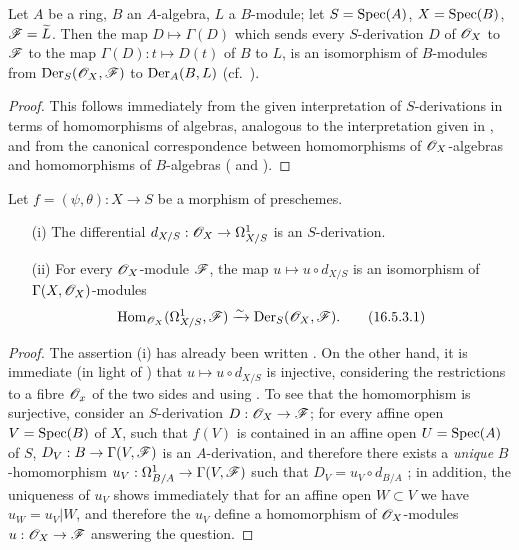 \begin{proposition}[16.5.2]
\label{IV.16.5.2}
Let $A$ be a ring, $B$ an $A$-algebra, $L$ a $B$-module;
let $S = \operatorname{Spec}(A)$, $X=\operatorname{Spec}(B)$, $\mathscr{F} = \widetilde{L}$.
Then the map $D \mapsto \Gamma(D)$ which sends every $S$-derivation $D$ of $\mathscr{O}_X$ to $\mathscr{F}$ to the map $\Gamma(D) : t \mapsto D(t)$ of $B$ to $L$, is an isomorphism of $B$-modules from $\operatorname{Der}_S(\mathscr{O}_X, \mathscr{F})$ to $\operatorname{Der}_A(B, L)$ (cf.~).
\end{proposition}

\begin{proof}
This follows immediately from the given interpretation of $S$-derivations in terms
of homomorphisms of algebras, analogous to the interpretation given in , and from the canonical correspondence between homomorphisms of $\mathscr{O}_X$-algebras and homomorphisms of $B$-algebras ( and ).
\end{proof}

\begin{proposition}[16.5.3]
\label{IV.16.5.3}
Let $f = (\psi, \theta) : X \to S$ be a morphism of preschemes.
\begin{enumerate}
  \item[{\rm(i)}] The differential $d_{X/S} : \sh{O}_X \to \Omega_{X/S}^1$  is an $S$-derivation.
  \item[{\rm(ii)}] For every $\mathscr{O}_X$-module $\mathscr{F}$, the map $u \mapsto u \circ d_{X/S}$ is an isomorphism of $\Gamma(X, \mathscr{O}_X)$-modules
  \[
  \label{IV.16.5.3.1}
    \operatorname{Hom}_{\mathscr{O}_X}(\Omega_{X/S}^1, \mathscr{F}) \xrightarrow{\sim} \operatorname{Der}_S(\mathscr{O}_X, \mathscr{F}).
    \tag{16.5.3.1}
  \]
\end{enumerate}
\end{proposition}

\begin{proof}
The assertion (i) has already been written .
On the other hand, it is immediate (in light of ) that $u \mapsto u\circ d_{X/S}$ is injective, considering the restrictions to a fibre $\mathscr{O}_x$ of the two sides and using .
To see that the homomorphism  is surjective, consider an $S$-derivation $D : \sh{O}_X \to \sh{F}$;
for every affine open $V = \operatorname{Spec}(B)$ of $X$, such that $f(V)$ is contained in an affine open $U = \operatorname{Spec}(A)$ of $S$, $D_V : B \to \Gamma(V, \sh{F}) $ is an $A$-derivation, and therefore there exists a \emph{unique} $B$-homomorphism $u_V : \Omega_{B/A}^1 \to \Gamma(V, \sh{F})$ such that $D_V = u_V \circ d_{B/A}$ ;
in addition, the uniqueness of $u_V$ shows immediately that for an affine open $W \subset V$ we have $u_W = u_V|W$, and therefore the $u_V$ define a homomorphism of $\mathscr{O}_X$-modules $u : \sh{O}_X \to \sh{F}$ answering the question.
\end{proof}

